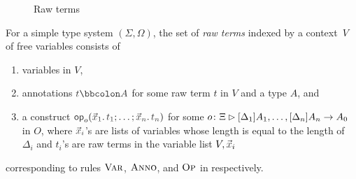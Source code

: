 \begin{definition}
\begin{figure}
  \centering
  \small
  \caption{Raw terms}
  \label{fig:raw-terms}
\end{figure}
  For a simple type system $(\Sigma, \Omega)$, the set of \emph{raw terms} indexed by a context~$V$ of free variables consists of
  \begin{enumerate}
    \item variables in $V$,
    \item annotations $\isTerm{t \annotate A}$ for some raw term $t$ in $V$ and a type $A$, and
    \item a construct $\tmOpts$ for some $o\colon \Xi \rhd [\Delta_1]A_{1}, \ldots, [\Delta_{n}] A_{n} \to A_0$ in $O$, where $\vars{x}_{\isTerm{i}}$'s are lists of variables whose length is equal to the length of~$\Delta_i$ and $t_i$'s are raw terms in the variable list $V, \vars{x}_i$
  \end{enumerate}
  corresponding to rules $\textnormal{\textsc{Var}}$, $\textnormal{\textsc{Anno}}$, and $\textnormal{\textsc{Op}}$ in  respectively.
\end{definition}


